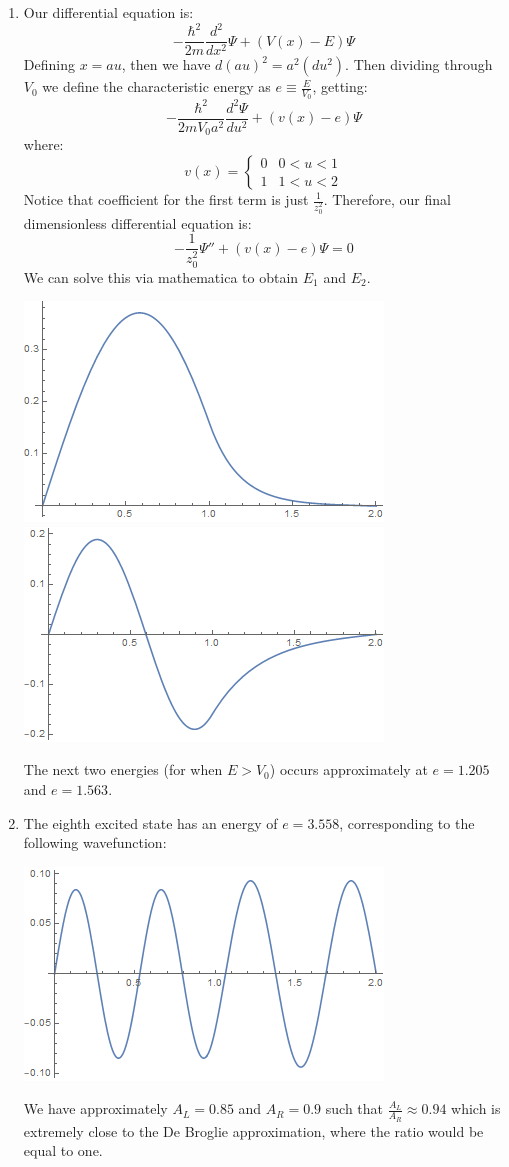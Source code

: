 \newpage
\begin{sol}
\begin{enumerate}[label=\textbf{(\alph*)}]
\item Our differential equation is:
$$-\frac{\hbar^2}{2m}\frac{d^2}{dx^2}\Psi+(V(x)-E)\Psi$$
Defining $x=au$, then we have $d(au)^2=a^2(du^2)$. Then dividing through $V_0$ we define the characteristic energy as $e\equiv \frac{E}{V_0}$, getting:
$$-\frac{\hbar^2}{2mV_0a^2}\frac{d^2\Psi}{du^2}+(v(x)-e)\Psi$$
where:
$$v(x)=\begin{cases}0 & 0<u<1 \\
1 & 1<u<2\end{cases}$$
Notice that coefficient for the first term is just $\frac{1}{z_0^2}$. Therefore, our final dimensionless differential equation is:
$$-\frac{1}{z_0^2}\Psi''+(v(x)-e)\Psi=0$$
We can solve this via mathematica to obtain $E_1$ and $E_2$.
\begin{center}
    \includegraphics[width=0.35\linewidth]{Images/E1.png}
    \includegraphics[width=0.35\linewidth]{Images/E2.jpg}
\end{center}
The next two energies (for when $E>V_0$) occurs approximately at $e=1.205$ and $e=1.563$.
\item The eighth excited state has an energy of $e=3.558$, corresponding to the following wavefunction:
\begin{center}
    \includegraphics[width=0.4\linewidth]{Images/E8.png}
\end{center}
We have approximately $A_L=0.85$ and $A_R=0.9$ such that $\frac{A_L}{A_R}\approx 0.94$ which is extremely close to the De Broglie approximation, where the ratio would be equal to one.
\end{enumerate}
\end{sol}